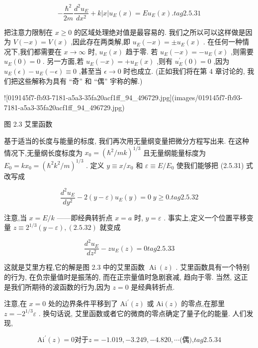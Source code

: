 \documentclass[lang=cn,newtx,10pt,scheme=chinese,thmcnt=section]{elegantbook}
\begin{document}
$$
- \frac{{\hbar }^{2}}{2m}\frac{{d}^{2}{u}_{E}}{d{x}^{2}} + k\left| x\right| {u}_{E}\left( x\right) = E{u}_{E}\left( x\right) . tag{2.5.31}
$$

把注意力限制在 $x \geq 0$ 的区域处理绝对值是最容易的. 我们之所以可以这样做是因为 $V\left( {-x}\right) = V\left( x\right)$ ,因此存在两类解,即 ${u}_{E}\left( {-x}\right) = \pm {u}_{E}\left( x\right)$ . 在任何一种情况下,我们都需要在 $x \rightarrow \infty$ 时, ${u}_{E}\left( x\right)$ 趋于零. 若 ${u}_{E}\left( {-x}\right) = - {u}_{E}\left( x\right)$ ,则需要 ${u}_{E}\left( 0\right) = 0$ . 另一方面,若 ${u}_{E}\left( {-x}\right) = + {u}_{E}\left( x\right)$ ,则有 ${u}_{E}^{\prime }\left( 0\right) = 0$ ,因为 ${u}_{E}\left( \epsilon \right) - {u}_{E}\left( {-\epsilon }\right) \equiv 0$ ,甚至当 $\epsilon \rightarrow 0$ 时也成立. (正如我们将在第 4 章讨论的, 我们把这些解称为具有 “奇” 和 “偶” 宇称的解.)

![019145f7-fb93-7181-a5a3-35fa20acf1ff_94_496729.jpg](images/019145f7-fb93-7181-a5a3-35fa20acf1ff_94_496729.jpg)

图 2.3 艾里函数

基于适当的长度与能量的标度, 我们再次用无量纲变量把微分方程写出来. 在这种情况下,无量纲长度标度为 ${x}_{0} = {\left( {\hbar }^{2}/mk\right) }^{1/3}$ 且无量纲能量标度为 ${E}_{0} = k{x}_{0} = {\left( {\hbar }^{2}{k}^{2}/m\right) }^{1/3}$ . 定义 $y \equiv x/{x}_{0}$ 和 $\varepsilon \equiv E/{E}_{0}$ 使我们能够把 (2.5.31) 式改写成

$$
\frac{{d}^{2}{u}_{E}}{d{y}^{2}} - 2\left( {y - \varepsilon }\right) {u}_{E}\left( y\right) = 0\;y \geq 0. tag{2.5.32}
$$

注意,当 $x = E/k$ ——即经典转折点 $x = a$ 时, $y = \varepsilon$ . 事实上,定义一个位置平移变量 $z \equiv {2}^{1/3}\left( {y - \varepsilon }\right) ,\left( {2.5.32}\right)$ 就变成

$$
\frac{{d}^{2}{u}_{E}}{d{z}^{2}} - z{u}_{E}\left( z\right) = 0 tag{2. 5.33}
$$

这就是艾里方程,它的解是图 2.3 中的艾里函数 $\operatorname{Ai}\left( z\right)$ . 艾里函数具有一个特别的行为, 在负宗量值时是振荡的, 而在正宗量值时急剧衰减, 趋向于零. 当然, 这正是我们所期待的波函数的行为,因为 $z = 0$ 是经典转折点.

注意,在 $x = 0$ 处的边界条件平移到了 ${\mathrm{{Ai}}}^{\prime }\left( z\right)$ 或 $\mathrm{{Ai}}\left( z\right)$ 的零点,在那里 $z = - {2}^{1/3}\varepsilon$ . 换句话说, 艾里函数或者它的微商的零点确定了量子化的能量. 人们发现,

$$
{\mathrm{{Ai}}}^{\prime }\left( z\right) = 0\text{对于}z = - {1.019}, - {3.249}, - {4.820},\cdots \text{(偶),} tag{2. 5.34}
$$
\end{document}
